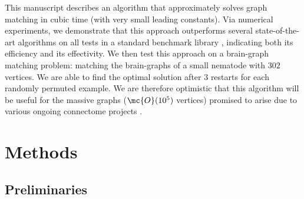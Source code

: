 \documentclass[10pt,journal,cspaper,compsoc]{IEEEtran}
\begin{document}
This manuscript describes an algorithm that approximately solves graph matching in cubic time (with very small leading constants).  Via numerical experiments, we demonstrate that this approach outperforms several state-of-the-art algorithms on all tests in a standard benchmark library \cite{Burkard1997}, indicating both its efficiency and its effectivity. We then test this approach on a brain-graph matching problem: matching the brain-graphs of a small nematode with $302$ vertices.  We are able to find the optimal solution after $3$ restarts for each randomly permuted example.  We are therefore optimistic that this algorithm will be useful for the massive graphs ($\mc{O}(10^5)$ vertices)  promised to arise due to various ongoing connectome projects \cite{HCP,OCP}.










\section{Methods} %
\label{sec:methods}


\subsection{Preliminaries} %
\label{sub:preliminaries}

\end{document}
